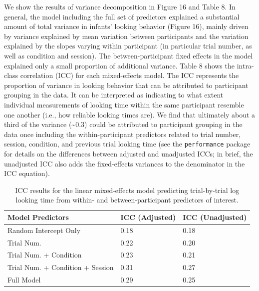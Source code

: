 \documentclass[
  man, donotrepeattitle,floatsintext]{apa6}
\begin{document}
We show the results of variance decomposition in Figure 16 and Table 8.
In general, the model including the full set of predictors explained a substantial amount of total variance in infants' looking behavior (Figure 16), mainly driven by variance explained by mean variation between participants and the variation explained by the slopes varying within participant (in particular trial number, as well as condition and session).
The between-participant fixed effects in the model explained only a small proportion of additional variance.
Table 8 shows the intra-class correlation (ICC) for each mixed-effects model.
The ICC represents the proportion of variance in looking behavior that can be attributed to participant grouping in the data.
It can be interpreted as indicating to what extent individual measurements of looking time within the same participant resemble one another (i.e., how reliable looking times are).
We find that ultimately about a third of the variance (\textasciitilde0.3) could be attributed to participant grouping in the data once including the within-participant predictors related to trial number, session, condition, and previous trial looking time (see the \texttt{performance} package for details on the differences between adjusted and unadjusted ICCs; in brief, the unadjusted ICC also adds the fixed-effects variances to the denominator in the ICC equation).

\begin{table}[tbp]

\begin{center}
\begin{threeparttable}

\caption{\label{tab:unnamed-chunk-45}ICC results for the linear mixed-effects model predicting trial-by-trial log looking time from within- and between-participant predictors of interest.}

\begin{tabular}{lll}
\toprule
Model Predictors & \multicolumn{1}{c}{ICC (Adjusted)} & \multicolumn{1}{c}{ICC (Unadjusted)}\\
\midrule
Random Intercept Only & 0.18 & 0.18\\
Trial Num. & 0.22 & 0.20\\
Trial Num. + Condition & 0.23 & 0.21\\
Trial Num. + Condition + Session & 0.31 & 0.27\\
Full Model & 0.29 & 0.25\\
\bottomrule
\end{tabular}

\end{threeparttable}
\end{center}

\end{table}
\end{document}
